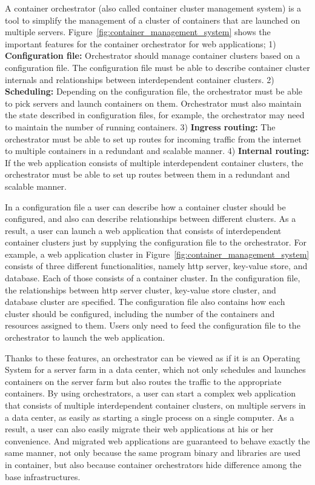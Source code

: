 A container orchestrator (also called container cluster management system) is a tool to simplify the management of a cluster of containers that are launched on multiple servers.
%
%
Figure~\ref{fig:container_management_system} shows the important features for the container orchestrator for web applications;
1) {\bf Configuration file:} Orchestrator should manage container clusters based on a configuration file. 
The configuration file must be able to describe container cluster internals and relationships between interdependent container clusters.
2) {\bf Scheduling:} Depending on the configuration file, the orchestrator must be able to pick servers and launch containers on them.
Orchestrator must also maintain the state described in configuration files, for example, the orchestrator may need to maintain the number of running containers.
3) {\bf Ingress routing:} The orchestrator must be able to set up routes for incoming traffic from the internet to multiple containers in a redundant and scalable manner.
4) {\bf Internal routing:} If the web application consists of multiple interdependent container clusters, the orchestrator must be able to set up routes between them in a redundant and scalable manner.

In a configuration file a user can describe how a container cluster should be configured, and also can describe relationships between different clusters.
As a result, a user can launch a web application that consists of interdependent container clusters just by supplying the configuration file to the orchestrator.
For example, a web application cluster in Figure~\ref{fig:container_management_system} consists of three different functionalities, namely http server, key-value store, and database.
Each of those consists of a container cluster.
In the configuration file, the relationships between http server cluster, key-value store cluster, and database cluster are specified.
The configuration file also contains how each cluster should be configured, including the number of the containers and resources assigned to them.
Users only need to feed the configuration file to the orchestrator to launch the web application.

Thanks to these features, an orchestrator can be viewed as if it is an Operating System for a server farm in a data center, which not only schedules and launches containers on the server farm but also routes the traffic to the appropriate containers.
By using orchestrators, a user can start a complex web application that consists of multiple interdependent container clusters, on multiple servers in a data center, as easily as starting a single process on a single computer.
As a result, a user can also easily migrate their web applications at his or her convenience.
And migrated web applications are guaranteed to behave exactly the same manner, not only because the same program binary and libraries are used in container, but also because container orchestrators hide difference among the base infrastructures.

